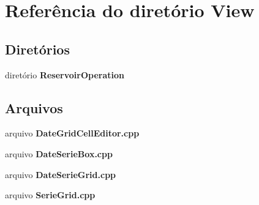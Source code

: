 \section{Referência do diretório View}
\label{dir_7784d12364ef0ec21cd188ca9cb3a89c}
\subsection*{Diretórios}
\begin{DoxyCompactItemize}
\item 
diretório {\bf Reservoir\+Operation}
\end{DoxyCompactItemize}
\subsection*{Arquivos}
\begin{DoxyCompactItemize}
\item 
arquivo {\bf Date\+Grid\+Cell\+Editor.\+cpp}
\item 
arquivo {\bf Date\+Serie\+Box.\+cpp}
\item 
arquivo {\bf Date\+Serie\+Grid.\+cpp}
\item 
arquivo {\bf Serie\+Grid.\+cpp}
\end{DoxyCompactItemize}
